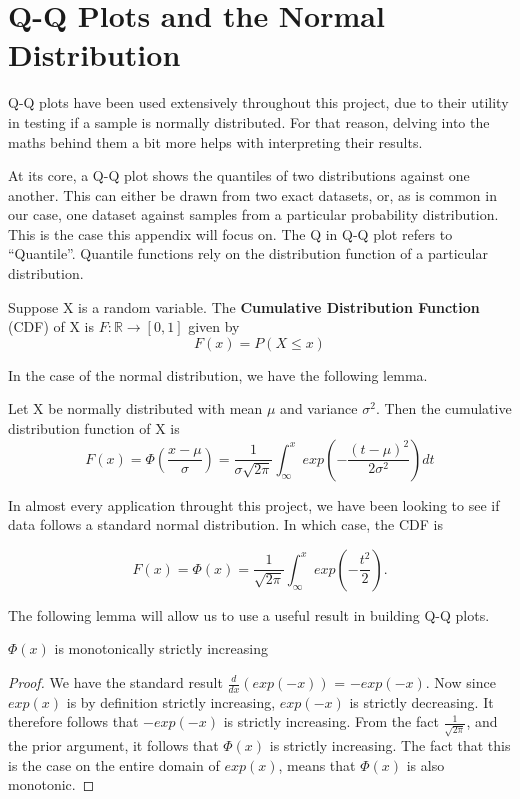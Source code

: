 \chapter{Q-Q Plots and the Normal Distribution}

Q-Q plots have been used extensively throughout this project, due to their utility in testing if a sample is normally distributed.
For that reason, delving into the maths behind them a bit more helps with interpreting their results. 

At its core, a Q-Q plot shows the quantiles of two distributions against one another. This can either be drawn from two exact datasets,
or, as is common in our case, one dataset against samples from a particular probability distribution. This is the case this appendix will focus on. 
The Q in Q-Q plot refers to ``Quantile''. Quantile functions rely on the distribution function of a particular distribution.

\begin{definition}
    Suppose X is a random variable. The \textbf{Cumulative Distribution Function} (CDF) of X is $F:\mathbb{R} \to [0,1] $ given by
    \[
        F(x) = P(X \leq x)  
    \]
\end{definition}

In the case of the normal distribution, we have the following lemma.

\begin{lemma}
    Let X be normally distributed with mean $\mu$ and variance $\sigma^2$. Then the cumulative distribution function of X is 
    \[
        F(x) = \Phi\left(\frac{x-\mu}{\sigma}\right) = \frac{1}{\sigma \sqrt{2 \pi}}\int_{\infty}^{x}exp\left( -\frac{(t-\mu)^2}{2\sigma^2} \right) dt
    \]
\end{lemma}

In almost every application throught this project, we have been looking to see if data follows a standard normal distribution. In which case, the
CDF is 

\[
    F(x) = \Phi(x) = \frac{1}{\sqrt{2\pi}}\int_{\infty}^{x}exp\left( -\frac{t^2}{2}\right).  
\]

The following lemma will allow us to use a useful result in building Q-Q plots.

\begin{lemma}
    $\Phi(x)$ is monotonically strictly increasing
\end{lemma}

\begin{proof}
    We have the standard result $\frac{d}{dx}\left(exp(-x)\right)$ = $-exp(-x)$. Now since $exp(x)$ is by definition strictly increasing, $exp(-x)$ is strictly decreasing. It 
    therefore follows that $-exp(-x)$ is strictly increasing. From the fact $\frac{1}{\sqrt{2\pi}}$, and the prior argument, it follows that $\Phi(x)$ is strictly increasing.
    The fact that this is the case on the entire domain of $exp(x)$, means that $\Phi(x)$ is also monotonic. 
\end{proof}

